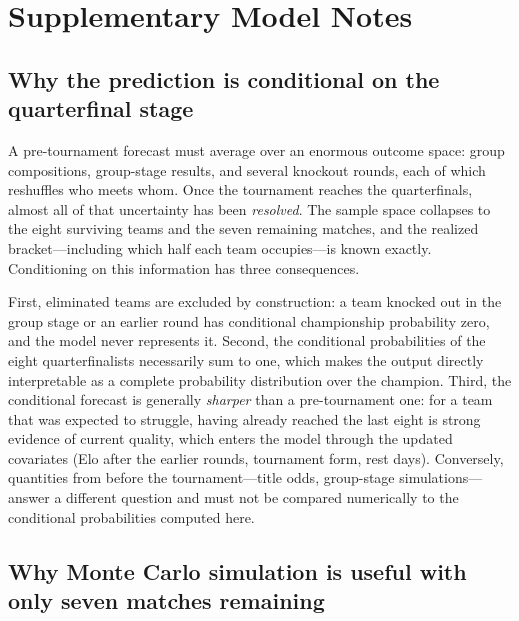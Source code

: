 
\section{Supplementary Model Notes}
\label{app:notes}

\subsection{Why the prediction is conditional on the quarterfinal stage}
\label{app:conditional}

A pre-tournament forecast must average over an enormous outcome space: group
compositions, group-stage results, and several knockout rounds, each of which
reshuffles who meets whom. Once the tournament reaches the quarterfinals,
almost all of that uncertainty has been \emph{resolved}. The sample space
collapses to the eight surviving teams and the seven remaining matches, and
the realized bracket---including which half each team occupies---is known
exactly. Conditioning on this information has three consequences.

First, eliminated teams are excluded by construction: a team knocked out in
the group stage or an earlier round has conditional championship probability
zero, and the model never represents it. Second, the conditional
probabilities of the eight quarterfinalists necessarily sum to one, which
makes the output directly interpretable as a complete probability
distribution over the champion. Third, the conditional forecast is generally \emph{sharper} than a
pre-tournament one: for a team that was expected to struggle, having already
reached the last eight is strong evidence of current quality, which enters the
model through the updated covariates (Elo after the earlier rounds, tournament
form, rest days). Conversely, quantities from before the tournament---title
odds, group-stage simulations---answer a different question and must not be
compared numerically to the conditional probabilities computed here.

\subsection{Why Monte Carlo simulation is useful with only seven matches
remaining}
\label{app:whymc}

